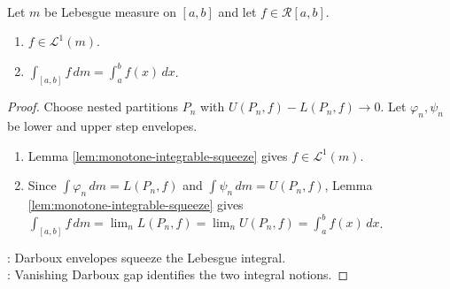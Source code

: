 \begin{theorem} \label{thm:riemann-lebesgue-comparison} \\
Let $m$ be Lebesgue measure on $[a,b]$ and let $f\in\mathcal{R}[a,b]$.
\begin{enumerate}[label=(\roman*)]
\setlength{\itemsep}{0pt}
\item $f\in\mathscr{L}^1(m)$.
\item $\int_{[a,b]}f\,dm=\int_a^bf(x)\,dx$.
\end{enumerate}
\begin{proof} Choose nested partitions $P_n$ with $U(P_n,f)-L(P_n,f)\to0$. Let $\varphi_n,\psi_n$ be lower and upper step envelopes.
\begin{enumerate}[label=(\roman*)]
\setlength{\itemsep}{0pt}
\item Lemma \ref{lem:monotone-integrable-squeeze} gives $f\in\mathscr{L}^1(m)$.
\item Since $\int\varphi_n\,dm=L(P_n,f)$ and $\int\psi_n\,dm=U(P_n,f)$, Lemma \ref{lem:monotone-integrable-squeeze} gives $\int_{[a,b]}f\,dm=\lim_nL(P_n,f)=\lim_nU(P_n,f)=\int_a^bf(x)\,dx$.
\end{enumerate}
: Darboux envelopes squeeze the Lebesgue integral.\\
: Vanishing Darboux gap identifies the two integral notions.
\end{proof}
\end{theorem}


